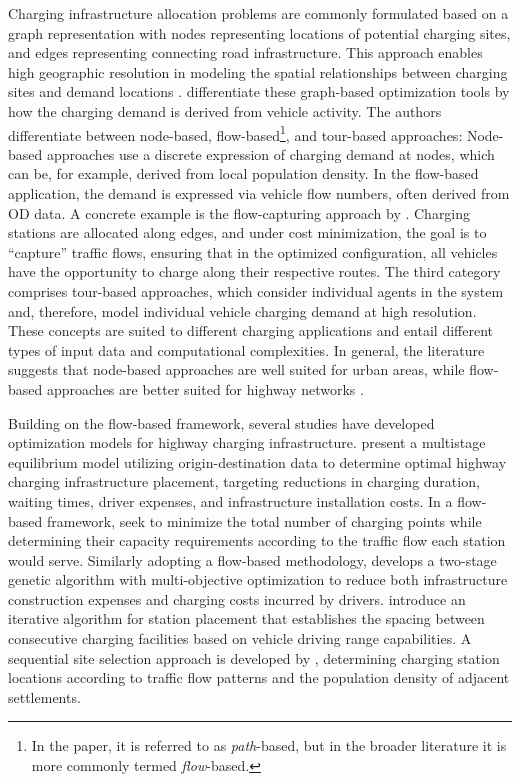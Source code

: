
         Charging infrastructure allocation problems are commonly formulated based on a graph representation with nodes representing locations of potential charging sites, and edges representing connecting road infrastructure. This approach enables high geographic resolution in modeling the spatial relationships between charging sites and demand locations \citep{Metais2022, li2024investigating}. \citet{Metais2022} differentiate these graph-based optimization tools by how the charging demand is derived from vehicle activity. The authors differentiate between node-based, flow-based\footnote{In the paper, it is referred to as \textit{path}-based, but in the broader literature it is more commonly termed \textit{flow}-based.}, and tour-based approaches: Node-based approaches use a discrete expression of charging demand at nodes, which can be, for example, derived from local population density. In the flow-based application, the demand is expressed via vehicle flow numbers, often derived from \ac{OD} data. A concrete example is the flow-capturing approach by \citet{KUBY2005125}. Charging stations are allocated along edges, and under cost minimization, the goal is to ``capture'' traffic flows, ensuring that in the optimized configuration, all vehicles have the opportunity to charge along their respective routes. The third category comprises tour-based approaches, which consider individual agents in the system and, therefore, model individual vehicle charging demand at high resolution. These concepts are suited to different charging applications and entail different types of input data and computational complexities. In general, the literature suggests that node-based approaches are well suited for urban areas, while flow-based approaches are better suited for highway networks \citep{Jochem2019, li2024investigating}. 
        
        Building on the flow-based framework, several studies have developed optimization models for highway charging infrastructure. \citet{Wang2018} present a multistage equilibrium model utilizing origin-destination data to determine optimal highway charging infrastructure placement, targeting reductions in charging duration, waiting times, driver expenses, and infrastructure installation costs. In a flow-based framework, \citet{Jochem2019} seek to minimize the total number of charging points while determining their capacity requirements according to the traffic flow each station would serve. Similarly adopting a flow-based methodology, \citet{7575934} develops a two-stage genetic algorithm with multi-objective optimization to reduce both infrastructure construction expenses and charging costs incurred by drivers. \citet{Napoli2020} introduce an iterative algorithm for station placement that establishes the spacing between consecutive charging facilities based on vehicle driving range capabilities. A sequential site selection approach is developed by \citet{Csiszar2020}, determining charging station locations according to traffic flow patterns and the population density of adjacent settlements.

